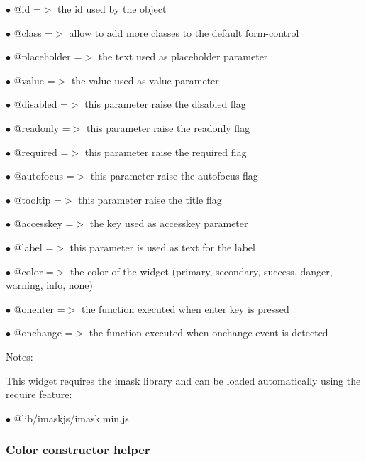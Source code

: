 \documentclass[a4paper]{article}
\begin{document}
\begin{compactitem}
\item[\color{myblue}$\bullet$] @id          =$>$ the id used by the object
\item[\color{myblue}$\bullet$] @class       =$>$ allow to add more classes to the default form-control
\item[\color{myblue}$\bullet$] @placeholder =$>$ the text used as placeholder parameter
\item[\color{myblue}$\bullet$] @value       =$>$ the value used as value parameter
\item[\color{myblue}$\bullet$] @disabled    =$>$ this parameter raise the disabled flag
\item[\color{myblue}$\bullet$] @readonly    =$>$ this parameter raise the readonly flag
\item[\color{myblue}$\bullet$] @required    =$>$ this parameter raise the required flag
\item[\color{myblue}$\bullet$] @autofocus   =$>$ this parameter raise the autofocus flag
\item[\color{myblue}$\bullet$] @tooltip     =$>$ this parameter raise the title flag
\item[\color{myblue}$\bullet$] @accesskey   =$>$ the key used as accesskey parameter
\item[\color{myblue}$\bullet$] @label       =$>$ this parameter is used as text for the label
\item[\color{myblue}$\bullet$] @color       =$>$ the color of the widget (primary, secondary, success, danger, warning, info, none)
\item[\color{myblue}$\bullet$] @onenter     =$>$ the function executed when enter key is pressed
\item[\color{myblue}$\bullet$] @onchange    =$>$ the function executed when onchange event is detected
\end{compactitem}

Notes:

This widget requires the imask library and can be loaded automatically using the require
feature:

\begin{compactitem}
\item[\color{myblue}$\bullet$] @lib/imaskjs/imask.min.js
\end{compactitem}

\hypertarget{toc54}{}
\subsubsection{Color constructor helper}
\end{document}
